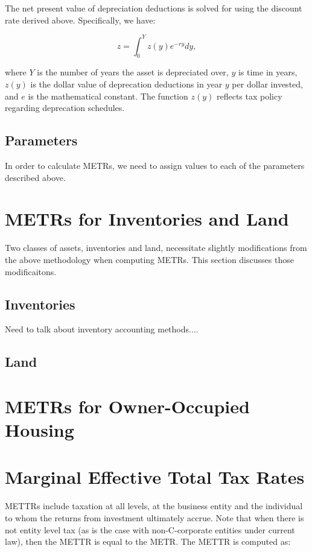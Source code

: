 \documentclass[article,11pt,letterpaper,fleqn]{article}
\theoremstyle{definition}
\numberwithin{equation}{section}
\begin{document}
The net present value of depreciation deductions is solved for using the discount rate derived above.  Specifically, we have: 

\begin{equation}
z = \int_{0}^{Y}z(y)e^{-ry}dy,
\end{equation}

\noindent\noindent where $Y$ is the number of years the asset is depreciated over, $y$ is time in years, $z(y)$ is the dollar value of deprecation deductions in year $y$ per dollar invested, and $e$ is the mathematical constant.  The function $z(y)$ reflects tax policy regarding deprecation schedules.  

\subsection{Parameters}

In order to calculate METRs, we need to assign values to each of the parameters described above.  


\section{METRs for Inventories and Land}

Two classes of assets, inventories and land, necessitate slightly modifications from the above methodology when computing METRs.  This section discusses those modificaitons.

\subsection{Inventories}

Need to talk about inventory accounting methods....

\subsection{Land}



\section{METRs for Owner-Occupied Housing}

\section{Marginal Effective Total Tax Rates}

METTRs include taxation at all levels, at the business entity and the individual to whom the returns from investment ultimately accrue.  Note that when there is not entity level tax (as is the case with non-C-corporate entities under current law), then the METTR is equal to the METR.  The METTR is computed as:
\end{document}
